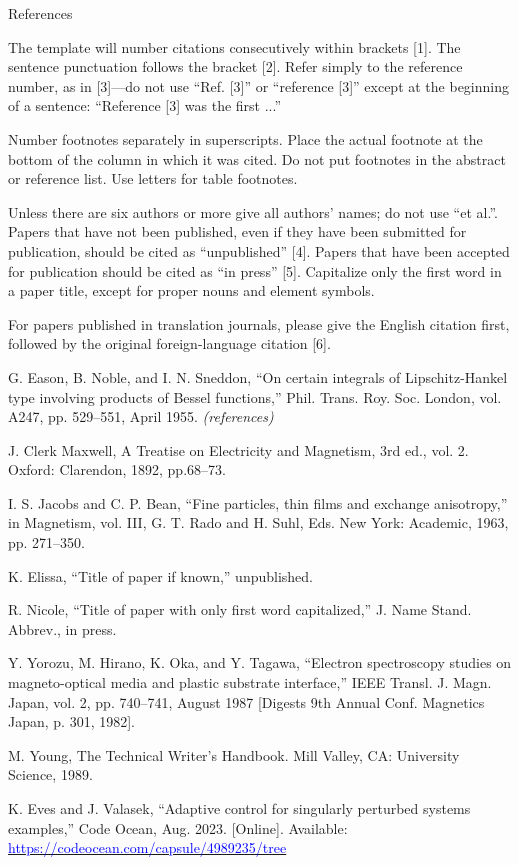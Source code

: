 \documentclass[preprint,12pt,authoryear]{elsarticle}
\begin{document}
References

The template will number citations consecutively within brackets [1]. The sentence punctuation follows the bracket [2]. Refer simply to the reference number, as in [3]—do not use “Ref. [3]” or “reference [3]” except at the beginning of a sentence: “Reference [3] was the first ...”

Number footnotes separately in superscripts. Place the actual footnote at the bottom of the column in which it was cited. Do not put footnotes in the abstract or reference list. Use letters for table footnotes.

Unless there are six authors or more give all authors’ names; do not use “et al.”. Papers that have not been published, even if they have been submitted for publication, should be cited as “unpublished” [4]. Papers that have been accepted for publication should be cited as “in press” [5]. Capitalize only the first word in a paper title, except for proper nouns and element symbols.

For papers published in translation journals, please give the English citation first, followed by the original foreign-language citation [6].

G. Eason, B. Noble, and I. N. Sneddon, “On certain integrals of Lipschitz-Hankel type involving products of Bessel functions,” Phil. Trans. Roy. Soc. London, vol. A247, pp. 529–551, April 1955. \textit{(references)}

J. Clerk Maxwell, A Treatise on Electricity and Magnetism, 3rd ed., vol. 2. Oxford: Clarendon, 1892, pp.68–73.

I. S. Jacobs and C. P. Bean, “Fine particles, thin films and exchange anisotropy,” in Magnetism, vol. III, G. T. Rado and H. Suhl, Eds. New York: Academic, 1963, pp. 271–350.

K. Elissa, “Title of paper if known,” unpublished.

R. Nicole, “Title of paper with only first word capitalized,” J. Name Stand. Abbrev., in press.

Y. Yorozu, M. Hirano, K. Oka, and Y. Tagawa, “Electron spectroscopy studies on magneto-optical media and plastic substrate interface,” IEEE Transl. J. Magn. Japan, vol. 2, pp. 740–741, August 1987 [Digests 9th Annual Conf. Magnetics Japan, p. 301, 1982].

M. Young, The Technical Writer’s Handbook. Mill Valley, CA: University Science, 1989.

K. Eves and J. Valasek, “Adaptive control for singularly perturbed systems examples,” Code Ocean, Aug. 2023. [Online]. Available: \href{https://codeocean.com/capsule/4989235/tree}{\textcolor{blue}{https://codeocean.com/capsule/4989235/tree}} 
\end{document}
